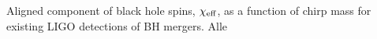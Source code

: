  \label{fig:BHspin} Aligned component of black hole spins, $\chi_{\rm eff}$, as a function of chirp mass for existing LIGO detections of BH mergers. Alle 
